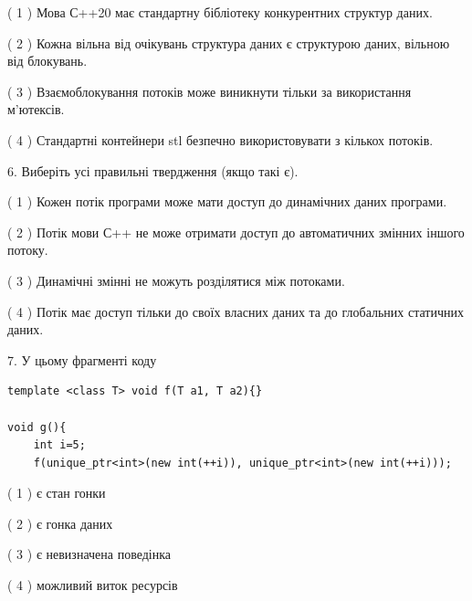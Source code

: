 \documentclass[12pt, ukrainian]{article}
\begin{document}
\begin {large}
{( 1 ) Мова С++20 має стандартну бібліотеку конкурентних структур даних.%

( 2 ) Кожна вільна від очікувань структура даних є структурою даних, вільною від блокувань.%

( 3 ) Взаємоблокування потоків може виникнути тільки за використання м’ютексів.%

( 4 ) Стандартні контейнери stl безпечно використовувати з кількох потоків.%
\newpage



\vspace{5mm}
6. Виберіть усі правильні твердження (якщо такі є).\par
\vspace{2mm}

( 1 ) Кожен потік програми може мати доступ до динамічних даних програми.%

( 2 ) Потік мови С++ не може отримати доступ до автоматичних змінних іншого потоку.%

( 3 ) Динамічні змінні не можуть розділятися між потоками.%

( 4 ) Потік має доступ тільки до своїх власних даних та до глобальних статичних даних.%


\vspace{5mm}
7. У цьому фрагменті коду
\begin{verbatim}
template <class T> void f(T a1, T a2){}

void g(){
    int i=5;
    f(unique_ptr<int>(new int(++i)), unique_ptr<int>(new int(++i)));
\end{verbatim}

( 1 ) є стан гонки%

( 2 ) є гонка даних%

( 3 ) є невизначена поведінка%

( 4 ) можливий виток ресурсів%
}
\end {large}
\end{document}
